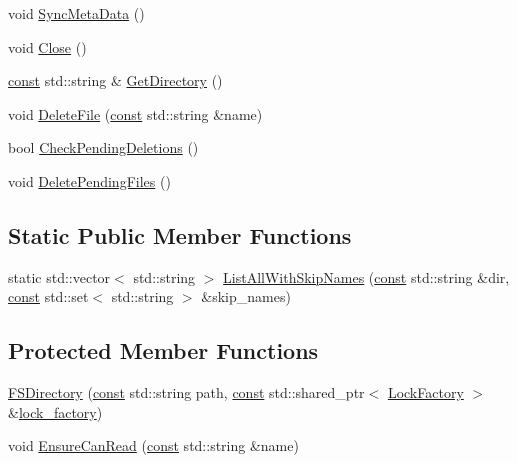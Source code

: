 \begin{DoxyCompactItemize}
\item 
void \mbox{\hyperlink{classlucene_1_1core_1_1store_1_1FSDirectory_a3427605a8d3b36c51f623896f73e525c}{Sync\+Meta\+Data}} ()
\item 
void \mbox{\hyperlink{classlucene_1_1core_1_1store_1_1FSDirectory_a5d0ea9b7fb90cbf6647276089a95b1a8}{Close}} ()
\item 
\mbox{\hyperlink{ZlibCrc32_8h_a2c212835823e3c54a8ab6d95c652660e}{const}} std\+::string \& \mbox{\hyperlink{classlucene_1_1core_1_1store_1_1FSDirectory_ae6eb75c5f4a89406d3aae2587098f78b}{Get\+Directory}} ()
\item 
void \mbox{\hyperlink{classlucene_1_1core_1_1store_1_1FSDirectory_a73d5bc12c68a2d5367d63c3256657a6a}{Delete\+File}} (\mbox{\hyperlink{ZlibCrc32_8h_a2c212835823e3c54a8ab6d95c652660e}{const}} std\+::string \&name)
\item 
bool \mbox{\hyperlink{classlucene_1_1core_1_1store_1_1FSDirectory_a82323816746e66f25406ce12a533b6b2}{Check\+Pending\+Deletions}} ()
\item 
void \mbox{\hyperlink{classlucene_1_1core_1_1store_1_1FSDirectory_afcbf784d0e537dcb65ef847a90dfc2d1}{Delete\+Pending\+Files}} ()
\end{DoxyCompactItemize}
\subsection*{Static Public Member Functions}
\begin{DoxyCompactItemize}
\item 
static std\+::vector$<$ std\+::string $>$ \mbox{\hyperlink{classlucene_1_1core_1_1store_1_1FSDirectory_ad7c805ef344532b94337e476252fc9a2}{List\+All\+With\+Skip\+Names}} (\mbox{\hyperlink{ZlibCrc32_8h_a2c212835823e3c54a8ab6d95c652660e}{const}} std\+::string \&dir, \mbox{\hyperlink{ZlibCrc32_8h_a2c212835823e3c54a8ab6d95c652660e}{const}} std\+::set$<$ std\+::string $>$ \&skip\+\_\+names)
\end{DoxyCompactItemize}
\subsection*{Protected Member Functions}
\begin{DoxyCompactItemize}
\item 
\mbox{\hyperlink{classlucene_1_1core_1_1store_1_1FSDirectory_acb5f2add52231ebdbe138aad6d9cc0fb}{F\+S\+Directory}} (\mbox{\hyperlink{ZlibCrc32_8h_a2c212835823e3c54a8ab6d95c652660e}{const}} std\+::string path, \mbox{\hyperlink{ZlibCrc32_8h_a2c212835823e3c54a8ab6d95c652660e}{const}} std\+::shared\+\_\+ptr$<$ \mbox{\hyperlink{classlucene_1_1core_1_1store_1_1LockFactory}{Lock\+Factory}} $>$ \&\mbox{\hyperlink{classlucene_1_1core_1_1store_1_1BaseDirectory_a61e759bb8ca8ec591d2a067679164f3a}{lock\+\_\+factory}})
\item 
void \mbox{\hyperlink{classlucene_1_1core_1_1store_1_1FSDirectory_a08ad6588d4372560666fd62bf21f84db}{Ensure\+Can\+Read}} (\mbox{\hyperlink{ZlibCrc32_8h_a2c212835823e3c54a8ab6d95c652660e}{const}} std\+::string \&name)
\end{DoxyCompactItemize}
